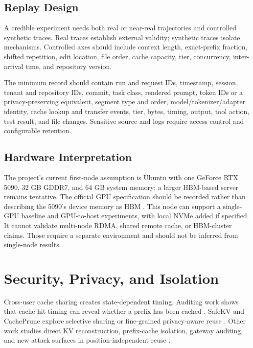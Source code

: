 \documentclass[conference,10pt]{IEEEtran}
\begin{document}
\subsection{Replay Design}

A credible experiment needs both real or near-real trajectories and controlled synthetic traces. Real traces establish external validity; synthetic traces isolate mechanisms. Controlled axes should include context length, exact-prefix fraction, shifted repetition, edit location, file order, cache capacity, tier, concurrency, inter-arrival time, and repository version.

The minimum record should contain run and request IDs, timestamp, session, tenant and repository IDs, commit, task class, rendered prompt, token IDs or a privacy-preserving equivalent, segment type and order, model/tokenizer/adapter identity, cache lookup and transfer events, tier, bytes, timing, output, tool action, test result, and file changes. Sensitive source and logs require access control and configurable retention.

\subsection{Hardware Interpretation}

The project's current first-node assumption is Ubuntu with one GeForce RTX 5090, 32 GB GDDR7, and 64 GB system memory; a larger HBM-based server remains tentative. The official GPU specification should be recorded rather than describing the 5090's device memory as HBM \cite{d18nvidia}. This node can support a single-GPU baseline and GPU-to-host experiments, with local NVMe added if specified. It cannot validate multi-node RDMA, shared remote cache, or HBM-cluster claims. Those require a separate environment and should not be inferred from single-node results.

\section{Security, Privacy, and Isolation}

Cross-user cache sharing creates state-dependent timing. Auditing work shows that cache-hit timing can reveal whether a prefix has been cached \cite{gu2025auditing}. SafeKV and CachePrune explore selective sharing or fine-grained privacy-aware reuse \cite{chu2025selective,wu2026cacheprune}. Other work studies direct KV reconstruction, prefix-cache isolation, gateway auditing, and new attack surfaces in position-independent reuse \cite{luo2025shadow,pennas2026prefixwall,fahey2026cacheprobe,zhang2026hijackkv}.
\end{document}
